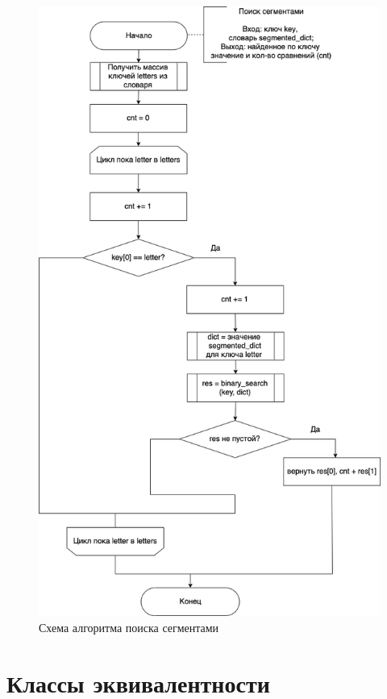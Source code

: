 \documentclass[a4paper,14pt, unknownkeysallowed]{extreport}
\begin{document}
\begin{figure}[h]
	\centering
	\includegraphics[scale=0.53]{report_files/segment_search_scheme.png}
	\caption{Схема алгоритма поиска сегментами}
	\label{fig:segment_search}
\end{figure}

\clearpage


\section{Классы эквивалентности}
\end{document}
